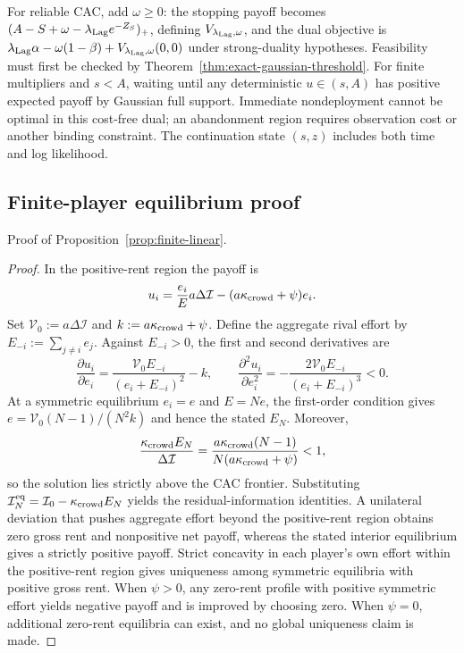 \documentclass[11pt]{article}
\numberwithin{equation}{section}
\theoremstyle{plain}
\theoremstyle{definition}
\theoremstyle{remark}
\begin{document}
For reliable CAC, add $\omega\ge0$: the stopping payoff becomes $(A-S+\omega-\lambda_{\rm Lag}e^{-Z_S})_+$, defining $V_{\lambda_{\rm Lag},\omega}$, and the dual objective is $\lambda_{\rm Lag}\alpha-\omega(1-\beta)+V_{\lambda_{\rm Lag},\omega}(0,0)$ under strong-duality hypotheses. Feasibility must first be checked by Theorem~\ref{thm:exact-gaussian-threshold}. For finite multipliers and $s<A$, waiting until any deterministic $u\in(s,A)$ has positive expected payoff by Gaussian full support. Immediate nondeployment cannot be optimal in this cost-free dual; an abandonment region requires observation cost or another binding constraint. The continuation state $(s,z)$ includes both time and log likelihood.


\subsection{Finite-player equilibrium proof}\label{app:finite-player-proof}

Proof of Proposition~\ref{prop:finite-linear}.
\begin{proof} In the positive-rent region the payoff is
\[
u_i=\frac{e_i}{E}a\Delta\mathcal I-(a{\kappa_{{\rm crowd}}}+\psi)e_i.
\]
Set $\mathcal V_0:=a\Delta\mathcal I$ and $k:=a{\kappa_{{\rm crowd}}}+\psi$. Define the aggregate rival effort by $E_{-i}:=\sum_{j\ne i}e_j$. Against $E_{-i}>0$, the first and second derivatives are
\[
\frac{\partial u_i}{\partial e_i}
=\frac{\mathcal V_0 E_{-i}}{(e_i+E_{-i})^2}-k,
\qquad
\frac{\partial^2 u_i}{\partial e_i^2}
=-\frac{2\mathcal V_0 E_{-i}}{(e_i+E_{-i})^3}<0.
\]
At a symmetric equilibrium \(e_i=e\) and \(E=Ne\), the first-order condition
gives \(e=\mathcal V_0(N-1)/(N^2k)\) and hence the stated \(E_N\). Moreover,
\[
\frac{{\kappa_{{\rm crowd}}} E_N}{\Delta\mathcal I}
=\frac{a{\kappa_{{\rm crowd}}}(N-1)}{N(a{\kappa_{{\rm crowd}}}+\psi)}<1,
\]
so the solution lies strictly above the CAC frontier. Substituting
$\mathcal I_N^{\rm eq}=\mathcal I_0-{\kappa_{{\rm crowd}}} E_N$ yields the residual-information identities. A unilateral deviation that pushes aggregate effort beyond the positive-rent region obtains zero gross rent and nonpositive net payoff, whereas the stated interior equilibrium gives a strictly positive payoff. Strict concavity in each player's own effort within the positive-rent region gives uniqueness among symmetric equilibria with positive gross rent. When $\psi>0$, any zero-rent profile with positive symmetric effort yields negative payoff and is improved by choosing zero. When $\psi=0$, additional zero-rent equilibria can exist, and no global uniqueness claim is made. \end{proof}
\end{document}
